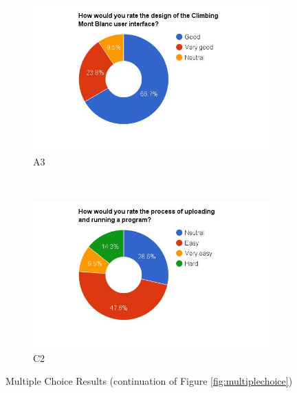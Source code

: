 \begin{figure}
    \begin{subfigure}[h]{0.45\textwidth}
        \centerline{\includegraphics[width=1.5\textwidth]{results/design_cmb.jpg}}
        \caption{A3}
        \label{fig:cmb-design}
    \end{subfigure}
    ~ %
    \hfill
    \begin{subfigure}[h]{0.45\textwidth}
        \centerline{\includegraphics[width=1.5\textwidth]{results/submission_cmb.jpg}}
        \caption{C2}
        \label{fig:cmb-submission}
    \end{subfigure}
    \caption[]{Multiple Choice Results (continuation of Figure \ref{fig:multiplechoice})}
    \label{fig:multiplechoice1}
\end{figure}

